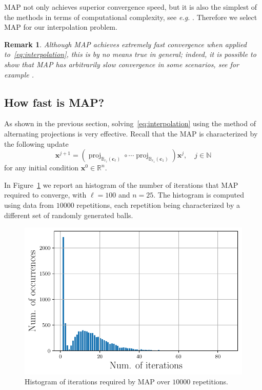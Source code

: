 \documentclass{article}
\DeclareMathOperator{\proj}{proj}
\newtheorem{remark}[theorem]{Remark}
\newcommand{\N}{\mathbb{N}}
\newcommand{\R}{\mathbb{R}}
\newcommand{\x}{\mathbold{x}}
\newcommand{\ball}[2]{\mathbb{B}_{#2}(#1)}
\newcommand{\cv}{\mathbold{c}}
\begin{document}
MAP not only achieves superior convergence speed, but it is also the simplest of the methods in terms of computational complexity, see \emph{e.g.} \cite{reich_projection_2015}. Therefore we select MAP for our interpolation problem. 

\begin{remark}
Although MAP achieves extremely fast convergence when applied to~\eqref{eq:interpolation}, this is by no means true in general; indeed, it is possible to show that MAP has \emph{arbitrarily slow} convergence in some scenarios, see for example \cite{hundal_alternating_2004,bauschke_characterizing_2009}.
\end{remark}

\subsection{How fast is MAP?}
As shown in the previous section, solving~\eqref{eq:interpolation} using the method of alternating projections is very effective. Recall that the MAP is characterized by the following update
\begin{equation}\label{eq:alternating_projections}
	\x^{j+1} = (\proj_{\ball{\cv_{\ell}}{r_{\ell}}} \circ \cdots \proj_{\ball{\cv_1}{r_1}}) \x^j, \quad j \in \N
\end{equation}
for any initial condition $\x^0 \in \R^n$.

In Figure~\ref{fig:map-histogram} we report an histogram of the number of iterations that MAP required to converge, with $\ell = 100$ and $n = 25$. The histogram is computed using data from $10000$ repetitions, each repetition being characterized by a different set of randomly generated balls.

\begin{figure}[!ht]
\centering
\includegraphics[width = 0.9\columnwidth]{Figures/MAP_histogram}
\caption{Histogram of iterations required by MAP over $10000$ repetitions.}
\label{fig:map-histogram}
\end{figure}
\end{document}
